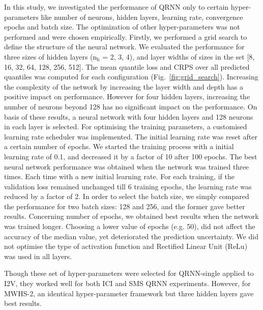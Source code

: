 \documentclass[amt, manuscript]{copernicus}
\begin{document}
In this study, we investigated the performance of QRNN only to certain hyper-parameters like number of neurons, hidden layers, learning rate, convergence epochs and batch size. The optimization of other hyper-parameters was not performed and were chosen empirically. Firstly, we performed a grid search to define the structure of the neural network. We evaluated the performance for three sizes of hidden layers ($\mathrm{n_h}$ = 2, 3, 4), and layer widths of sizes in the set [8, 16, 32, 64, 128, 256, 512]. The mean quantile loss and CRPS over all predicted quantiles was computed for each configuration (Fig.~\ref{fig:grid_search}). Increasing the complexity of the network by increasing the layer width and depth has a positive impact on performance. However for four hidden layers, increasing the number of neurons beyond 128 has no significant impact on the performance. On basis of these results, a neural network with four hidden layers and 128 neurons in each layer is selected. For optimising the training parameters, a customised  learning rate scheduler was implemented. The initial learning rate was reset after a certain number of epochs.  We started the training process with a initial learning rate of 0.1, and decreased it by a factor of 10 after 100 epochs. The best neural network performance was obtained when the network was trained three times. Each time with a new initial learning rate. For each training, if the validation loss remained unchanged till 6 training epochs, the learning rate was reduced by a factor of 2. 
In order to select the batch size, we simply compared the performance for two batch sizes: 128 and 256, and the former gave better results. Concerning number of epochs, we obtained best results when the network was trained longer. Choosing a lower value of epochs (e.g. 50), did not affect the accuracy of the median value, yet deteriorated the prediction uncertainty. We did not optimise the type of activation function and Rectified Linear Unit (ReLu) was used in all layers. 

Though these set of hyper-parameters were selected for QRNN-single applied to I2V, they worked well for both ICI and SMS QRNN experiments. However, for MWHS-2, an identical hyper-parameter framework but three hidden layers gave best results.  




\noappendix       %
\end{document}
